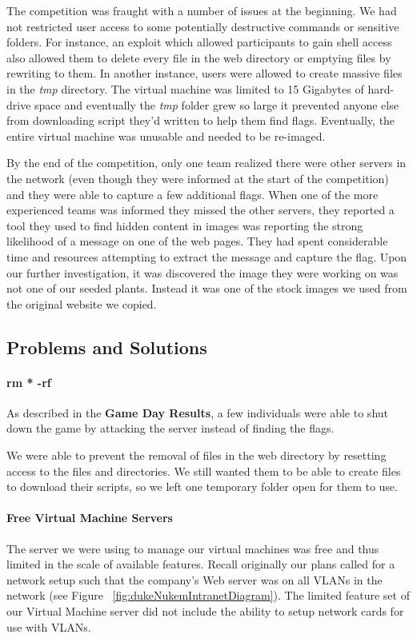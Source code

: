 \documentclass[10pt]{article}
\begin{document}
The competition was fraught with a number of issues at the beginning. We had not
restricted user access to some potentially destructive commands or sensitive
folders. For instance, an exploit which allowed participants to gain shell
access also allowed them to delete every file in the web directory or emptying
files by rewriting to them. In another instance, users were allowed to create
massive files in the \textit{tmp} directory. The virtual machine was limited to
15 Gigabytes of hard-drive space and eventually the \textit{tmp} folder grew so
large it prevented anyone else from downloading script they'd written to help
them find flags. Eventually, the entire virtual machine was unusable and needed
to be re-imaged.

By the end of the competition, only one team realized there were other servers
in the network (even though they were informed at the start of the competition)
and they were able to capture a few additional flags. When one of the more
experienced teams was informed they missed the other servers, they reported a
tool they used to find hidden content in images was reporting the strong
likelihood of a message on one of the web pages. They had spent considerable
time and resources attempting to extract the message and capture the flag. Upon
our further investigation, it was discovered the image they were working on was
not one of our seeded plants. Instead it was one of the stock images we used
from the original website we copied.

\subsection{Problems and Solutions}
\paragraph*{rm * -rf} As described in the \textbf{Game Day Results},
a few individuals were able to shut down the game by attacking the server
instead of finding the flags.

We were able to prevent the removal of files in the web directory by resetting
access to the files and directories. We still wanted them to be able to create
files to download their scripts, so we left one temporary folder open for them to
use. 

\paragraph*{Free Virtual Machine Servers} The server we were using to manage our
virtual machines was free and thus limited in the scale of available features.
Recall originally our plans called for a network setup such that the company's
Web server was on all VLANs in the network (see Figure
~\ref{fig:dukeNukemIntranetDiagram}). The limited feature set of our Virtual
Machine server did not include the ability to setup network cards for use with
VLANs. 
\end{document}
